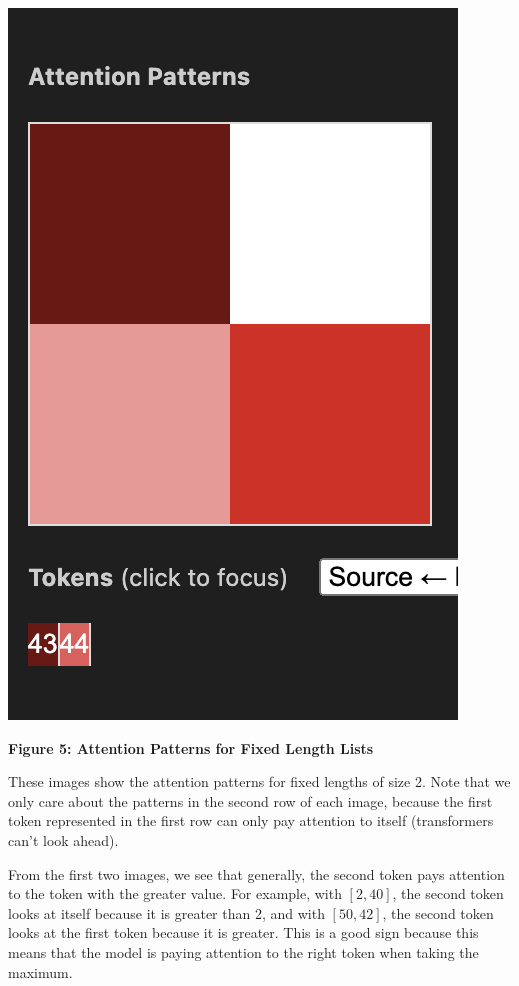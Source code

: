 \documentclass{article}
\begin{document}
\begin{center}
    \includegraphics[scale=0.4]{att_fixed_edge.png}

    \textbf{Figure 5: Attention Patterns for Fixed Length Lists}
\end{center}

These images show the attention patterns for fixed lengths of size 2. Note that we only care about the patterns in the second row of each image, because the first token represented in the first row can only pay attention to itself (transformers can't look ahead). 

From the first two images, we see that generally, the second token pays attention to the token with the greater value. For example, with $[2, 40]$, the second token looks at itself because it is greater than 2, and with $[50, 42]$, the second token looks at the first token because it is greater. This is a good sign because this means that the model is paying attention to the right token when taking the maximum. 
\end{document}
